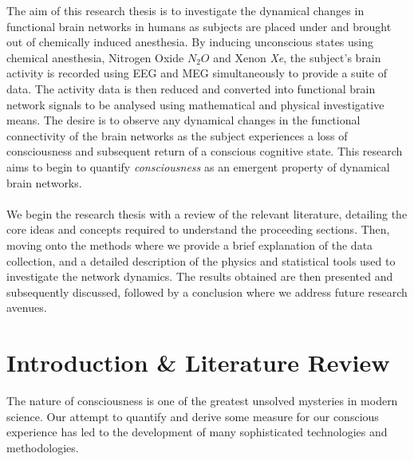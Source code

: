 \documentclass{article}
\begin{document}
The aim of this research thesis is to investigate the dynamical changes in functional brain networks in humans as subjects are placed under and brought out of chemically induced anesthesia. By inducing unconscious states using chemical anesthesia, Nitrogen Oxide $N_2O$ and Xenon \emph{Xe}, the subject's brain activity is recorded using EEG and MEG simultaneously to provide a suite of data. The activity data is then reduced and converted into functional brain network signals to be analysed using mathematical and physical investigative means. The desire is to observe any dynamical changes in the functional connectivity of the brain networks as the subject experiences a loss of consciousness and subsequent return of a conscious cognitive state. This research aims to begin to quantify \emph{consciousness} as an emergent property of dynamical brain networks.
\\
\\
We begin the research thesis with a review of the relevant literature, detailing the core ideas and concepts required to understand the proceeding sections. Then, moving onto the methods where we provide a brief explanation of the data collection, and a detailed description of the physics and statistical tools used to investigate the network dynamics. The results obtained are then presented and subsequently discussed, followed by a conclusion where we address future research avenues.

\section{Introduction \& Literature Review}
The nature of consciousness is one of the greatest unsolved mysteries in modern science. Our attempt to quantify and derive some measure for our conscious experience has led to the development of many sophisticated technologies and methodologies. 
\end{document}
